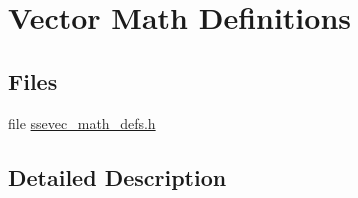 \hypertarget{group___vec_math_defs}{}\section{Vector Math Definitions}
\label{group___vec_math_defs}
\subsection*{Files}
\begin{DoxyCompactItemize}
\item 
file \hyperlink{ssevec__math__defs_8h}{ssevec\+\_\+math\+\_\+defs.\+h}
\end{DoxyCompactItemize}


\subsection{Detailed Description}
